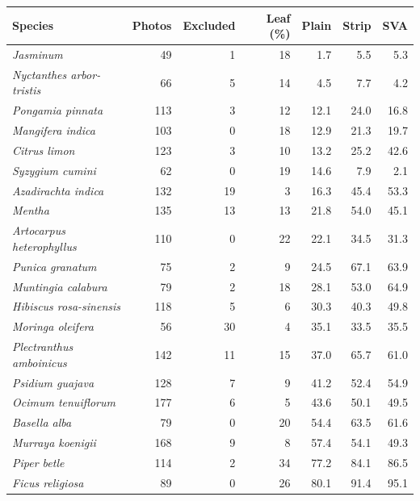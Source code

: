 \begin{tabular}{lrrrrrr}
\toprule
Species & Photos & Excluded & Leaf (\%) & Plain & Strip & SVA \\
\midrule
\textit{Jasminum} & 49 & 1 & 18 & 1.7 & 5.5 & 5.3 \\
\textit{Nyctanthes arbor-tristis} & 66 & 5 & 14 & 4.5 & 7.7 & 4.2 \\
\textit{Pongamia pinnata} & 113 & 3 & 12 & 12.1 & 24.0 & 16.8 \\
\textit{Mangifera indica} & 103 & 0 & 18 & 12.9 & 21.3 & 19.7 \\
\textit{Citrus limon} & 123 & 3 & 10 & 13.2 & 25.2 & 42.6 \\
\textit{Syzygium cumini} & 62 & 0 & 19 & 14.6 & 7.9 & 2.1 \\
\textit{Azadirachta indica} & 132 & 19 & 3 & 16.3 & 45.4 & 53.3 \\
\textit{Mentha} & 135 & 13 & 13 & 21.8 & 54.0 & 45.1 \\
\textit{Artocarpus heterophyllus} & 110 & 0 & 22 & 22.1 & 34.5 & 31.3 \\
\textit{Punica granatum} & 75 & 2 & 9 & 24.5 & 67.1 & 63.9 \\
\textit{Muntingia calabura} & 79 & 2 & 18 & 28.1 & 53.0 & 64.9 \\
\textit{Hibiscus rosa-sinensis} & 118 & 5 & 6 & 30.3 & 40.3 & 49.8 \\
\textit{Moringa oleifera} & 56 & 30 & 4 & 35.1 & 33.5 & 35.5 \\
\textit{Plectranthus amboinicus} & 142 & 11 & 15 & 37.0 & 65.7 & 61.0 \\
\textit{Psidium guajava} & 128 & 7 & 9 & 41.2 & 52.4 & 54.9 \\
\textit{Ocimum tenuiflorum} & 177 & 6 & 5 & 43.6 & 50.1 & 49.5 \\
\textit{Basella alba} & 79 & 0 & 20 & 54.4 & 63.5 & 61.6 \\
\textit{Murraya koenigii} & 168 & 9 & 8 & 57.4 & 54.1 & 49.3 \\
\textit{Piper betle} & 114 & 2 & 34 & 77.2 & 84.1 & 86.5 \\
\textit{Ficus religiosa} & 89 & 0 & 26 & 80.1 & 91.4 & 95.1 \\
\bottomrule
\end{tabular}